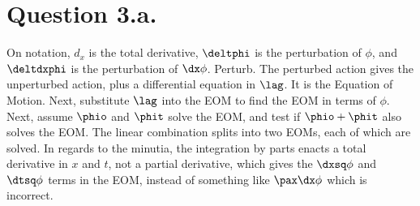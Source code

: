 \documentclass{article}
\begin{document}
\section{Question 3.a.}
On notation, $d_x$ is the total derivative, $\deltphi$ is the perturbation of $\phi$, and $\deltdxphi$ is the perturbation of $\dx \phi$.
Perturb.
The perturbed action gives the unperturbed action, plus a differential equation in $\lag$. It is the Equation of Motion.
Next, substitute $\lag$ into the EOM to find the EOM in terms of $\phi$.
Next, assume $\phio$ and $\phit$ solve the EOM, and test if $\phio+\phit$ also solves the EOM.
\e{\phi=\phio+\phit}
The linear combination splits into two EOMs, each of which are solved.
In regards to the minutia, the integration by parts enacts a total derivative in $x$ and $t$, not a partial derivative, which gives the $\dxsq \phi$ and $\dtsq \phi$ terms in the EOM, instead of something like $\pax \dx \phi$ which is incorrect.
\end{document}
